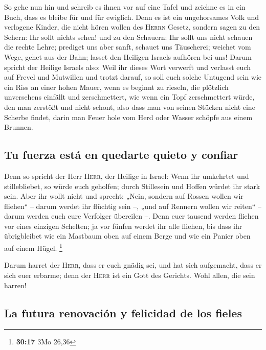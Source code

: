  So gehe nun hin und schreib es ihnen vor auf eine Tafel
und zeichne es in ein Buch, dass es bleibe für und für ewiglich.
 Denn es ist ein ungehorsames Volk und verlogene Kinder,
die nicht hören wollen des \textsc{Herrn} Gesetz, 
sondern sagen zu den Sehern: Ihr sollt nichts sehen! und zu den
Schauern: Ihr sollt uns nicht schauen die rechte Lehre; prediget uns
aber sanft, schauet uns Täuscherei;  weichet vom Wege,
gehet aus der Bahn; lasset den Heiligen Israels aufhören bei uns!
 Darum spricht der Heilige Israels also: Weil ihr dieses
Wort verwerft und verlasst euch auf Frevel und Mutwillen und trotzt
darauf,  so soll euch solche Untugend sein wie ein Riss
an einer hohen Mauer, wenn es beginnt zu rieseln, die plötzlich
unversehens einfällt und zerschmettert,  wie wenn ein
Topf zerschmettert würde, den man zerstößt und nicht schont, also dass
man von seinen Stücken nicht eine Scherbe findet, darin man Feuer hole
vom Herd oder Wasser schöpfe aus einem Brunnen.

\hypertarget{tu-fuerza-estuxe1-en-quedarte-quieto-y-confiar}{%
\subsection{Tu fuerza está en quedarte quieto y
confiar}\label{tu-fuerza-estuxe1-en-quedarte-quieto-y-confiar}}

 Denn so spricht der Herr \textsc{Herr}, der Heilige in
Israel: Wenn ihr umkehrtet und stillebliebet, so würde euch geholfen;
durch Stillesein und Hoffen würdet ihr stark sein. Aber ihr wollt nicht
 und sprecht: „Nein, sondern auf Rossen wollen wir
fliehen`` -- darum werdet ihr flüchtig sein --, „und auf Rennern wollen
wir reiten`` -- darum werden euch eure Verfolger übereilen --.
 Denn euer tausend werden fliehen vor eines einzigen
Schelten; ja vor fünfen werdet ihr alle fliehen, bis dass ihr
übrigbleibet wie ein Mastbaum oben auf einem Berge und wie ein Panier
oben auf einem Hügel. \footnote{\textbf{30:17} 3Mo 26,36}

 Darum harret der \textsc{Herr}, dass er euch gnädig sei,
und hat sich aufgemacht, dass er sich euer erbarme; denn der
\textsc{Herr} ist ein Gott des Gerichts. Wohl allen, die sein harren!

\hypertarget{la-futura-renovaciuxf3n-y-felicidad-de-los-fieles}{%
\subsection{La futura renovación y felicidad de los
fieles}\label{la-futura-renovaciuxf3n-y-felicidad-de-los-fieles}}

